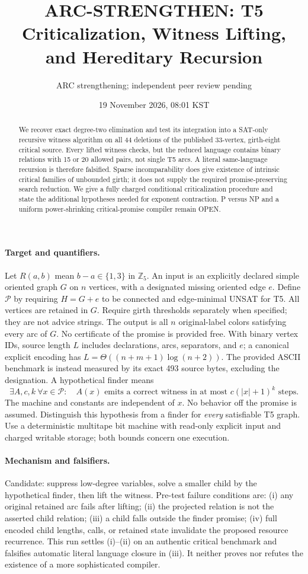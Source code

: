 \documentclass[11pt]{article}
\title{ARC-STRENGTHEN: T5 Criticalization, Witness Lifting, and Hereditary Recursion}
\author{ARC strengthening; independent peer review pending}
\date{19 November 2026, 08:01 KST}
\newcommand{\Z}{\mathbb Z_5}
\begin{document}
\maketitle
\begin{abstract}
We recover exact degree-two elimination and test its integration into a
SAT-only recursive witness algorithm on all 44 deletions of the published
33-vertex, girth-eight critical source. Every lifted witness checks, but the
reduced language contains binary relations with 15 or 20 allowed pairs, not
single T5 arcs. A literal same-language recursion is therefore falsified.
Sparse incomparability does give existence of intrinsic critical families of
unbounded girth; it does not supply the required promise-preserving search
reduction. We give a fully charged conditional criticalization procedure and
state the additional hypotheses needed for exponent contraction. P versus NP
and a uniform power-shrinking critical-promise compiler remain OPEN.
\end{abstract}

\paragraph{Target and quantifiers.}
Let $R(a,b)$ mean $b-a\in\{1,3\}$ in $\Z$.
An input is an explicitly declared simple oriented graph $G$ on $n$ vertices,
with a designated missing oriented edge $e$. Define $\mathcal P$ by requiring
$H=G+e$ to be connected and edge-minimal UNSAT for T5. All vertices are retained
in $G$. Require girth thresholds separately when specified; they are not advice
strings. The output is all $n$ original-label colors satisfying every arc of
$G$. No certificate of the promise is provided free. With binary vertex IDs,
source length $L$ includes declarations, arcs, separators, and $e$; a canonical
explicit encoding has $L=\Theta((n+m+1)\log(n+2))$. The provided ASCII benchmark
is instead measured by its exact 493 source bytes, excluding the designation.
A hypothetical finder means
\[
 \exists A,c,k\ \forall x\in\mathcal P:\quad
 A(x)\text{ emits a correct witness in at most }c(|x|+1)^k\text{ steps}.
\]
The machine and constants are independent of $x$. No behavior off the promise
is assumed. Distinguish this hypothesis from a finder for \emph{every}
satisfiable T5 graph. Use a deterministic multitape bit machine with read-only
explicit input and charged writable storage; both bounds concern one execution.

\paragraph{Mechanism and falsifiers.}
Candidate: suppress low-degree variables, solve a smaller child by the
hypothetical finder, then lift the witness. Pre-test failure conditions are:
(i) any original retained arc fails after lifting; (ii) the projected relation
is not the asserted child relation; (iii) a child falls outside the finder
promise; (iv) full encoded child lengths, calls, or retained state invalidate
the proposed resource recurrence. This run settles (i)--(ii) on an authentic
critical benchmark and falsifies automatic literal language closure in (iii).
It neither proves nor refutes the existence of a more sophisticated compiler.
\end{document}
